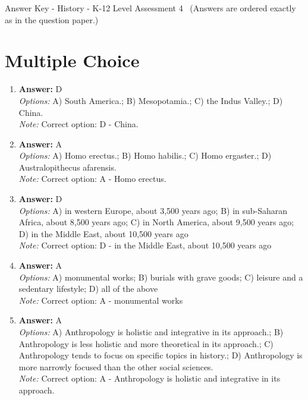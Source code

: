 \documentclass[12pt]{article}
\begin{document}
\begin{center}
Answer Key - History - K-12 Level Assessment 4 \
\small (Answers are ordered exactly as in the question paper.)
\end{center}

\section*{Multiple Choice}
\begin{enumerate}[label=\arabic*.]
\item \textbf{Answer:} D
\\ \textit{Options:} A) South America.; B) Mesopotamia.; C) the Indus Valley.; D) China.
\\ \textit{Note:} Correct option: D - China.
\item \textbf{Answer:} A
\\ \textit{Options:} A) Homo erectus.; B) Homo habilis.; C) Homo ergaster.; D) Australopithecus afarensis.
\\ \textit{Note:} Correct option: A - Homo erectus.
\item \textbf{Answer:} D
\\ \textit{Options:} A) in western Europe, about 3,500 years ago; B) in sub-Saharan Africa, about 8,500 years ago; C) in North America, about 9,500 years ago; D) in the Middle East, about 10,500 years ago
\\ \textit{Note:} Correct option: D - in the Middle East, about 10,500 years ago
\item \textbf{Answer:} A
\\ \textit{Options:} A) monumental works; B) burials with grave goods; C) leisure and a sedentary lifestyle; D) all of the above
\\ \textit{Note:} Correct option: A - monumental works
\item \textbf{Answer:} A
\\ \textit{Options:} A) Anthropology is holistic and integrative in its approach.; B) Anthropology is less holistic and more theoretical in its approach.; C) Anthropology tends to focus on specific topics in history.; D) Anthropology is more narrowly focused than the other social sciences.
\\ \textit{Note:} Correct option: A - Anthropology is holistic and integrative in its approach.
\end{enumerate}
\end{document}
